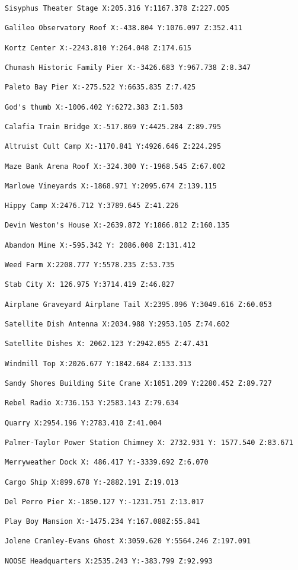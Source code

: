 \documentclass[
  openany]{book}
\begin{document}
\begin{verbatim}
Sisyphus Theater Stage X:205.316 Y:1167.378 Z:227.005

Galileo Observatory Roof X:-438.804 Y:1076.097 Z:352.411

Kortz Center X:-2243.810 Y:264.048 Z:174.615

Chumash Historic Family Pier X:-3426.683 Y:967.738 Z:8.347

Paleto Bay Pier X:-275.522 Y:6635.835 Z:7.425

God's thumb X:-1006.402 Y:6272.383 Z:1.503

Calafia Train Bridge X:-517.869 Y:4425.284 Z:89.795

Altruist Cult Camp X:-1170.841 Y:4926.646 Z:224.295

Maze Bank Arena Roof X:-324.300 Y:-1968.545 Z:67.002

Marlowe Vineyards X:-1868.971 Y:2095.674 Z:139.115

Hippy Camp X:2476.712 Y:3789.645 Z:41.226

Devin Weston's House X:-2639.872 Y:1866.812 Z:160.135

Abandon Mine X:-595.342 Y: 2086.008 Z:131.412

Weed Farm X:2208.777 Y:5578.235 Z:53.735

Stab City X: 126.975 Y:3714.419 Z:46.827

Airplane Graveyard Airplane Tail X:2395.096 Y:3049.616 Z:60.053

Satellite Dish Antenna X:2034.988 Y:2953.105 Z:74.602

Satellite Dishes X: 2062.123 Y:2942.055 Z:47.431

Windmill Top X:2026.677 Y:1842.684 Z:133.313

Sandy Shores Building Site Crane X:1051.209 Y:2280.452 Z:89.727

Rebel Radio X:736.153 Y:2583.143 Z:79.634

Quarry X:2954.196 Y:2783.410 Z:41.004

Palmer-Taylor Power Station Chimney X: 2732.931 Y: 1577.540 Z:83.671

Merryweather Dock X: 486.417 Y:-3339.692 Z:6.070

Cargo Ship X:899.678 Y:-2882.191 Z:19.013

Del Perro Pier X:-1850.127 Y:-1231.751 Z:13.017

Play Boy Mansion X:-1475.234 Y:167.088Z:55.841

Jolene Cranley-Evans Ghost X:3059.620 Y:5564.246 Z:197.091

NOOSE Headquarters X:2535.243 Y:-383.799 Z:92.993


\end{verbatim}
\end{document}
